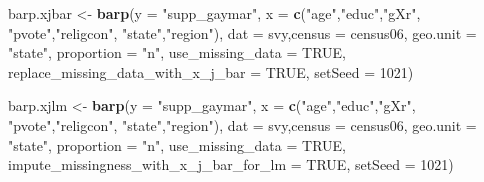 \documentclass[]{article}
\newenvironment{Shaded}{\begin{snugshade}}{\end{snugshade}}
\newcommand{\KeywordTok}[1]{\textcolor[rgb]{0.13,0.29,0.53}{\textbf{#1}}}
\newcommand{\DataTypeTok}[1]{\textcolor[rgb]{0.13,0.29,0.53}{#1}}
\newcommand{\DecValTok}[1]{\textcolor[rgb]{0.00,0.00,0.81}{#1}}
\newcommand{\StringTok}[1]{\textcolor[rgb]{0.31,0.60,0.02}{#1}}
\newcommand{\OtherTok}[1]{\textcolor[rgb]{0.56,0.35,0.01}{#1}}
\newcommand{\NormalTok}[1]{#1}
\begin{document}
\begin{Shaded}
\begin{Highlighting}[]
\NormalTok{barp.xjbar <-}\StringTok{ }\KeywordTok{barp}\NormalTok{(}\DataTypeTok{y =} \StringTok{"supp_gaymar"}\NormalTok{,}
                 \DataTypeTok{x =} \KeywordTok{c}\NormalTok{(}\StringTok{"age"}\NormalTok{,}\StringTok{"educ"}\NormalTok{,}\StringTok{"gXr"}\NormalTok{,}
                       \StringTok{"pvote"}\NormalTok{,}\StringTok{"religcon"}\NormalTok{,}
                       \StringTok{"state"}\NormalTok{,}\StringTok{"region"}\NormalTok{),}
                 \DataTypeTok{dat =}\NormalTok{ svy,}\DataTypeTok{census =}\NormalTok{ census06,}
                 \DataTypeTok{geo.unit =} \StringTok{"state"}\NormalTok{,}
                 \DataTypeTok{proportion =} \StringTok{"n"}\NormalTok{,}
                 \DataTypeTok{use_missing_data =} \OtherTok{TRUE}\NormalTok{,}
                 \DataTypeTok{replace_missing_data_with_x_j_bar =} \OtherTok{TRUE}\NormalTok{,}
                 \DataTypeTok{setSeed =} \DecValTok{1021}\NormalTok{)}

\NormalTok{barp.xjlm <-}\StringTok{ }\KeywordTok{barp}\NormalTok{(}\DataTypeTok{y =} \StringTok{"supp_gaymar"}\NormalTok{,}
                 \DataTypeTok{x =} \KeywordTok{c}\NormalTok{(}\StringTok{"age"}\NormalTok{,}\StringTok{"educ"}\NormalTok{,}\StringTok{"gXr"}\NormalTok{,}
                       \StringTok{"pvote"}\NormalTok{,}\StringTok{"religcon"}\NormalTok{,}
                       \StringTok{"state"}\NormalTok{,}\StringTok{"region"}\NormalTok{),}
                 \DataTypeTok{dat =}\NormalTok{ svy,}\DataTypeTok{census =}\NormalTok{ census06,}
                 \DataTypeTok{geo.unit =} \StringTok{"state"}\NormalTok{,}
                 \DataTypeTok{proportion =} \StringTok{"n"}\NormalTok{,}
                 \DataTypeTok{use_missing_data =} \OtherTok{TRUE}\NormalTok{,}
                 \DataTypeTok{impute_missingness_with_x_j_bar_for_lm =} \OtherTok{TRUE}\NormalTok{,}
                 \DataTypeTok{setSeed =} \DecValTok{1021}\NormalTok{)}
\end{Highlighting}
\end{Shaded}
\end{document}
